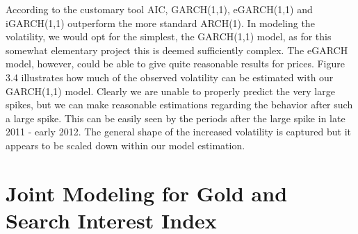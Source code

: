 \documentclass[a4paper]{article}
\theoremstyle{definition}
\begin{document}
According to the customary tool AIC, GARCH(1,1), eGARCH(1,1) and iGARCH(1,1) outperform the more standard ARCH(1). In modeling the volatility, we would opt for the simplest, the GARCH(1,1) model, as for this somewhat elementary project this is deemed sufficiently complex. The eGARCH model, however, could be able to give quite reasonable results for prices. Figure 3.4 illustrates how much of the observed volatility can be estimated with our GARCH(1,1) model. Clearly we are unable to properly predict the very large spikes, but we can make reasonable estimations regarding the behavior after such a large spike. This can be easily seen by the periods after the large spike in late 2011 - early 2012. The general shape of the increased volatility is captured but it appears to be scaled down within our model estimation.
\section{Joint Modeling for Gold and Search Interest Index}
\end{document}
